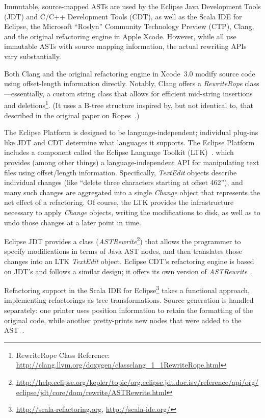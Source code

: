 \documentclass[prodmode]{acmlarge}
\begin{document}
Immutable, source-mapped ASTs are used by the Eclipse Java Development Tools
(JDT) and C/C++ Development Tools (CDT), as well as the Scala IDE for Eclipse,
the Microsoft ``Roslyn'' Community Technology Preview (CTP), Clang, and the
original refactoring engine in Apple Xcode.  However, while all use immutable
ASTs with source mapping information, the actual rewriting APIs vary
substantially.  

Both Clang and the original refactoring engine in Xcode~3.0 modify source code
using offset-length information directly.  Notably, Clang offers a
\textit{RewriteRope} class---essentially, a custom string class that allows for
efficient mid-string insertions and
deletions\footnote{RewriteRope Class Reference: \url{http://clang.llvm.org/doxygen/classclang_1_1RewriteRope.html}}.
(It uses a B-tree structure inspired by, but not identical to, that described
in the original paper on Ropes~\cite{boehm95ropes}.)
 
The Eclipse Platform is designed to be language-independent; individual
plug-ins like JDT and CDT determine what languages it supports.  The Eclipse
Platform includes a component called the Eclipse Language Toolkit
(LTK)~\cite{ltk}.  which provides (among other things) a language-independent
API for manipulating text files using offset/length information.  Specifically,
\textit{TextEdit} objects describe individual changes (like ``delete three
characters starting at offset 462''), and many such changes are aggregated into
a single \textit{Change} object that represents the net effect of a
refactoring.  Of course, the LTK provides the infrastructure necessary to apply
\textit{Change} objects, writing the modifications to disk, as well as to undo
those changes at a later point in time.

Eclipse JDT provides a class (\textit{ASTRewrite}\footnote{\url{http://help.eclipse.org/kepler/topic/org.eclipse.jdt.doc.isv/reference/api/org/eclipse/jdt/core/dom/rewrite/ASTRewrite.html}}) that allows the programmer
to specify modifications in terms of Java AST nodes, and then translates those
changes into an LTK \textit{TextEdit} object.  Eclipse CDT's refactoring engine
is based on JDT's and follows a similar design; it offers its own version of
\textit{ASTRewrite}~\cite{cdt-refactoring}.

Refactoring support in the Scala IDE for
Eclipse\footnote{\url{http://scala-refactoring.org},
\url{http://scala-ide.org/}} takes a functional approach, implementing
refactorings as tree transformations.  Source generation is handled separately:
one printer uses position information to retain the formatting of the original
code, while another pretty-prints new nodes that were added to the
AST~\cite{stocker10scala}.
\end{document}
